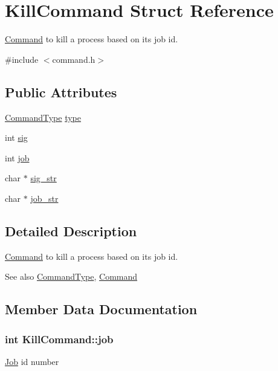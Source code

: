 \hypertarget{structKillCommand}{}\section{Kill\+Command Struct Reference}
\label{structKillCommand}


\hyperlink{unionCommand}{Command} to kill a process based on it\textquotesingle{}s job id.  




{\ttfamily \#include $<$command.\+h$>$}

\subsection*{Public Attributes}
\begin{DoxyCompactItemize}
\item 
\hyperlink{command_8h_a21e038f5b8958e203d28bc4f18472352}{Command\+Type} \hyperlink{structKillCommand_a9cd678bc0659f74340e3fca28766bcda}{type}
\item 
int \hyperlink{structKillCommand_a20f5367bbec80a936189c57b1f9db351}{sig}
\item 
int \hyperlink{structKillCommand_abd4689c605a3dfe202a1779f0d1191ae}{job}
\item 
char $\ast$ \hyperlink{structKillCommand_a879a36b90427ec640bef5c92a6c9c24e}{sig\+\_\+str}
\item 
char $\ast$ \hyperlink{structKillCommand_a174a9714a69550b0bbf611e59bfbf332}{job\+\_\+str}
\end{DoxyCompactItemize}


\subsection{Detailed Description}
\hyperlink{unionCommand}{Command} to kill a process based on it\textquotesingle{}s job id. 

\begin{DoxySeeAlso}{See also}
\hyperlink{command_8h_aa8311e0de296df9816965be35c31d925}{Command\+Type}, \hyperlink{unionCommand}{Command} 
\end{DoxySeeAlso}


\subsection{Member Data Documentation}
\subsubsection[{\texorpdfstring{job}{job}}]{\setlength{\rightskip}{0pt plus 5cm}int Kill\+Command\+::job}\hypertarget{structKillCommand_abd4689c605a3dfe202a1779f0d1191ae}{}\label{structKillCommand_abd4689c605a3dfe202a1779f0d1191ae}
\hyperlink{structJob}{Job} id number 
